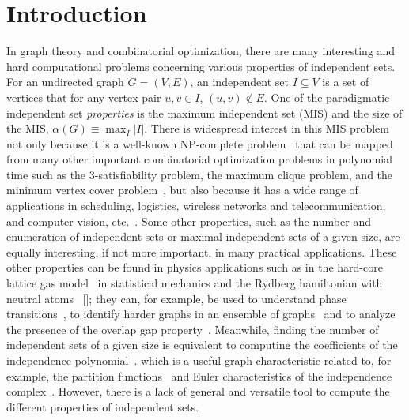 \documentclass[onefignum, onetabnum]{siamart190516}
\newcommand{\<}{\langle}
\renewcommand{\>}{\rangle}
\newcommand{\red}[1]{[{\bf  \color{red}{ST: #1}}]}
\newcounter{example}
\begin{document}
\section{Introduction}
In graph theory and combinatorial optimization, there are many interesting and hard computational problems concerning various properties of independent sets.
For an undirected graph $G = (V,E)$, an independent set $I \subseteq V$ is a set of vertices that for any vertex pair $u,v \in I$, $(u, v) \not\in E$. %
One of the paradigmatic independent set \textit{properties} %
is the maximum independent set (MIS) and the size of the MIS, $\alpha(G) \equiv \max_{I}|I|$. 
There is widespread interest in this MIS problem not only because it is a well-known NP-complete problem~\cite{Hastad1996} that can be mapped from many other important combinatorial optimization problems in polynomial time such as the 3-satisfiability problem, the maximum clique problem, and the minimum vertex cover problem~\cite{Moore2011},
but also because it has a wide range of applications in scheduling, logistics, wireless networks and telecommunication, and computer vision, etc.~\cite{Butenko2003, Wu2015}.
Some other properties, such as the number and enumeration of independent sets or maximal independent sets of a given size, are equally interesting, if not more important, in many practical applications. These other properties can be found in physics applications such as in the hard-core lattice gas model~\cite{Dyre2016, Fernandes2007}
in statistical mechanics and the Rydberg hamiltonian with neutral atoms~\cite{Pichler2018, Ebadi2022} \red{replace with experiment paper when ready};
they can, for example, be used to understand phase transitions~\cite{Dyre2016, Fernandes2007}, to identify harder graphs in an ensemble of graphs~\cite{Ebadi2022} and to analyze the presence of the overlap gap property~\cite{Gamarnik2013, Gamarnik2019}.
Meanwhile, finding the number of independent sets of a given size is equivalent to computing the coefficients of the independence polynomial~\cite{Harvey2018,Ferrin2014}.
which is a useful graph characteristic related to, for example, the partition functions~\cite{Lee1952,Yang1952} and Euler characteristics of the independence complex~\cite{Bousquet2008, Levit2009}. However, there is a lack of general and versatile tool to compute the different properties of independent sets.
\end{document}
